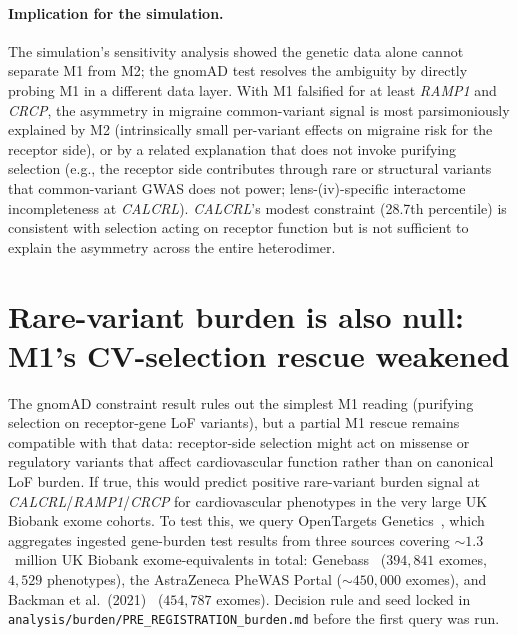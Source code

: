 \documentclass[11pt]{article}
\begin{document}
\paragraph{Implication for the simulation.} The simulation's sensitivity analysis showed the genetic data alone cannot separate M1 from M2; the gnomAD test resolves the ambiguity by directly probing M1 in a different data layer. With M1 falsified for at least \textit{RAMP1} and \textit{CRCP}, the asymmetry in migraine common-variant signal is most parsimoniously explained by M2 (intrinsically small per-variant effects on migraine risk for the receptor side), or by a related explanation that does not invoke purifying selection (e.g., the receptor side contributes through rare or structural variants that common-variant GWAS does not power; lens-(iv)-specific interactome incompleteness at \textit{CALCRL}). \textit{CALCRL}'s modest constraint (28.7th percentile) is consistent with selection acting on receptor function but is not sufficient to explain the asymmetry across the entire heterodimer.

\section{Rare-variant burden is also null: M1's CV-selection rescue weakened}
\label{sec:burden}

The gnomAD constraint result rules out the simplest M1 reading (purifying selection on receptor-gene LoF variants), but a partial M1 rescue remains compatible with that data: receptor-side selection might act on missense or regulatory variants that affect cardiovascular function rather than on canonical LoF burden. If true, this would predict positive rare-variant burden signal at \textit{CALCRL}/\textit{RAMP1}/\textit{CRCP} for cardiovascular phenotypes in the very large UK Biobank exome cohorts. To test this, we query OpenTargets Genetics~\cite{ochoa_2023_opentargets}, which aggregates ingested gene-burden test results from three sources covering $\sim 1.3$~million UK Biobank exome-equivalents in total: Genebass~\cite{karczewski_2022_genebass} ($394{,}841$ exomes, $4{,}529$ phenotypes), the AstraZeneca PheWAS Portal ($\sim 450{,}000$ exomes), and Backman et al.\ (2021)~\cite{backman_2021_azphewas} ($454{,}787$ exomes). Decision rule and seed locked in \texttt{analysis/burden/PRE\_REGISTRATION\_burden.md} before the first query was run.
\end{document}
